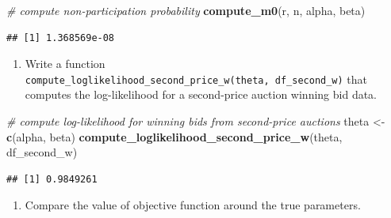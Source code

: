 \documentclass[]{book}
\newenvironment{Shaded}{\begin{snugshade}}{\end{snugshade}}
\newcommand{\KeywordTok}[1]{\textcolor[rgb]{0.13,0.29,0.53}{\textbf{#1}}}
\newcommand{\StringTok}[1]{\textcolor[rgb]{0.31,0.60,0.02}{#1}}
\newcommand{\CommentTok}[1]{\textcolor[rgb]{0.56,0.35,0.01}{\textit{#1}}}
\newcommand{\NormalTok}[1]{#1}
\providecommand{\tightlist}{%
  \setlength{\itemsep}{0pt}\setlength{\parskip}{0pt}}
\begin{document}
\begin{Shaded}
\begin{Highlighting}[]
\CommentTok{# compute non-participation probability}
\KeywordTok{compute_m0}\NormalTok{(r, n, alpha, beta)}
\end{Highlighting}
\end{Shaded}

\begin{verbatim}
## [1] 1.368569e-08
\end{verbatim}

\begin{enumerate}
\def\labelenumi{\arabic{enumi}.}
\setcounter{enumi}{1}
\tightlist
\item
  Write a function
  \texttt{compute\_loglikelihood\_second\_price\_w(theta,\ df\_second\_w)}
  that computes the log-likelihood for a second-price auction winning
  bid data.
\end{enumerate}

\begin{Shaded}
\begin{Highlighting}[]
\CommentTok{# compute log-likelihood for winning bids from second-price auctions}
\NormalTok{theta <-}\StringTok{ }\KeywordTok{c}\NormalTok{(alpha, beta)}
\KeywordTok{compute_loglikelihood_second_price_w}\NormalTok{(theta, df_second_w)}
\end{Highlighting}
\end{Shaded}

\begin{verbatim}
## [1] 0.9849261
\end{verbatim}

\begin{enumerate}
\def\labelenumi{\arabic{enumi}.}
\setcounter{enumi}{2}
\tightlist
\item
  Compare the value of objective function around the true parameters.
\end{enumerate}
\end{document}

